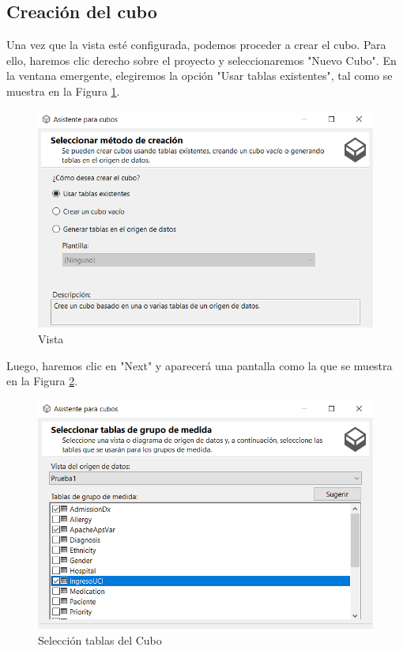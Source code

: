 \documentclass[12pt, a4paper, twoside]{article}
\begin{document}
\subsection{Creación del cubo}

	Una vez que la vista esté configurada, podemos proceder a crear el cubo. Para ello, haremos clic derecho sobre el proyecto y seleccionaremos "Nuevo Cubo". En la ventana emergente, elegiremos la opción "Usar tablas existentes", tal como se muestra en la Figura \ref{fig:9}.

	\begin{figure}[H]
		\centering
		\includegraphics[width=1\textwidth]{image/crearCubo}
		\caption{Vista}
		\label{fig:9}
	\end{figure}

	Luego, haremos clic en "Next" y aparecerá una pantalla como la que se muestra en la Figura \ref{fig:10}.

	\begin{figure}[H]
		\centering
		\includegraphics[width=1\textwidth]{image/seleccionTablasCubo}
		\caption{Selección tablas del Cubo}
		\label{fig:10}
	\end{figure}
\end{document}
